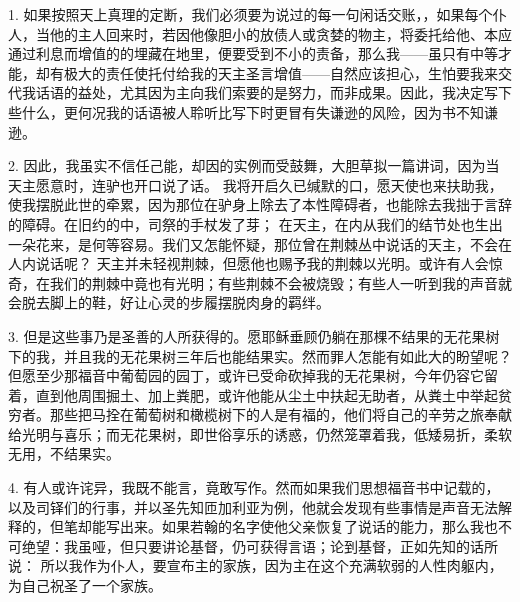 1. 如果按照天上真理的定断，我们必须要为说过的每一句闲话交账，，如果每个仆人，当他的主人回来时，若因他像胆小的放债人或贪婪的物主，将委托给他、本应通过利息而增值的的埋藏在地里，便要受到不小的责备，那么我——虽只有中等才能，却有极大的责任使托付给我的天主圣言增值——自然应该担心，生怕要我来交代我话语的益处，尤其因为主向我们索要的是努力，而非成果。因此，我决定写下些什么，更何况我的话语被人聆听比写下时更冒有失谦逊的风险，因为书不知谦逊。\par

2. 因此，我虽实不信任己能，却因的实例而受鼓舞，大胆草拟一篇讲词，因为当天主愿意时，连驴也开口说了话。 我将开启久已缄默的口，愿天使也来扶助我，使我摆脱此世的牵累，因为那位在驴身上除去了本性障碍者，也能除去我拙于言辞的障碍。在旧约的中，司祭的手杖发了芽； 在天主，在内从我们的结节处也生出一朵花来，是何等容易。我们又怎能怀疑，那位曾在荆棘丛中说话的天主，不会在人内说话呢？ 天主并未轻视荆棘，但愿他也赐予我的荆棘以光明。或许有人会惊奇，在我们的荆棘中竟也有光明；有些荆棘不会被烧毁；有些人一听到我的声音就会脱去脚上的鞋，好让心灵的步履摆脱肉身的羁绊。\par

3. 但是这些事乃是圣善的人所获得的。愿耶稣垂顾仍躺在那棵不结果的无花果树下的我，并且我的无花果树三年后也能结果实。然而罪人怎能有如此大的盼望呢？但愿至少那福音中葡萄园的园丁，或许已受命砍掉我的无花果树，今年仍容它留着，直到他周围掘土、加上粪肥，或许他能从尘土中扶起无助者，从粪土中举起贫穷者。那些把马拴在葡萄树和橄榄树下的人是有福的，他们将自己的辛劳之旅奉献给光明与喜乐；而无花果树，即世俗享乐的诱惑，仍然笼罩着我，低矮易折，柔软无用，不结果实。\par

4. 有人或许诧异，我既不能言，竟敢写作。然而如果我们思想福音书中记载的，以及司铎们的行事，并以圣先知匝加利亚为例，他就会发现有些事情是声音无法解释的，但笔却能写出来。如果若翰的名字使他父亲恢复了说话的能力，那么我也不可绝望：我虽哑，但只要讲论基督，仍可获得言语；论到基督，正如先知的话所说： 所以我作为仆人，要宣布主的家族，因为主在这个充满软弱的人性肉躯内，为自己祝圣了一个家族。\par



